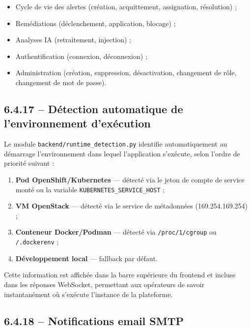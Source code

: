\documentclass[11pt,a4paper]{report}
\begin{document}
\begin{itemize}[label=\textbullet, leftmargin=1.5cm, labelsep=0.5cm,
                itemsep=0.1em, parsep=0em, topsep=0.2em]
    \item Cycle de vie des alertes (création, acquittement, assignation,
    résolution) ;
    \item Remédiations (déclenchement, application, blocage) ;
    \item Analyses IA (retraitement, injection) ;
    \item Authentification (connexion, déconnexion) ;
    \item Administration (création, suppression, désactivation, changement de
    rôle, changement de mot de passe).
\end{itemize}

\subsection*{6.4.17 -- Détection automatique de l'environnement d'exécution}

Le module \texttt{backend/runtime\_detection.py} identifie automatiquement
au démarrage l'environnement dans lequel l'application s'exécute, selon
l'ordre de priorité suivant :

\begin{enumerate}[leftmargin=1.5cm, labelsep=0.3cm, itemsep=0.1em]
    \item \textbf{Pod OpenShift/Kubernetes} — détecté via le jeton de compte
    de service monté ou la variable \texttt{KUBERNETES\_SERVICE\_HOST} ;
    \item \textbf{VM OpenStack} — détecté via le service de métadonnées
    (169.254.169.254) ;
    \item \textbf{Conteneur Docker/Podman} — détecté via \texttt{/proc/1/cgroup}
    ou \texttt{/.dockerenv} ;
    \item \textbf{Développement local} — fallback par défaut.
\end{enumerate}

Cette information est affichée dans la barre supérieure du frontend et
incluse dans les réponses WebSocket, permettant aux opérateurs de savoir
instantanément où s'exécute l'instance de la plateforme.

\subsection*{6.4.18 -- Notifications email SMTP}
\end{document}
